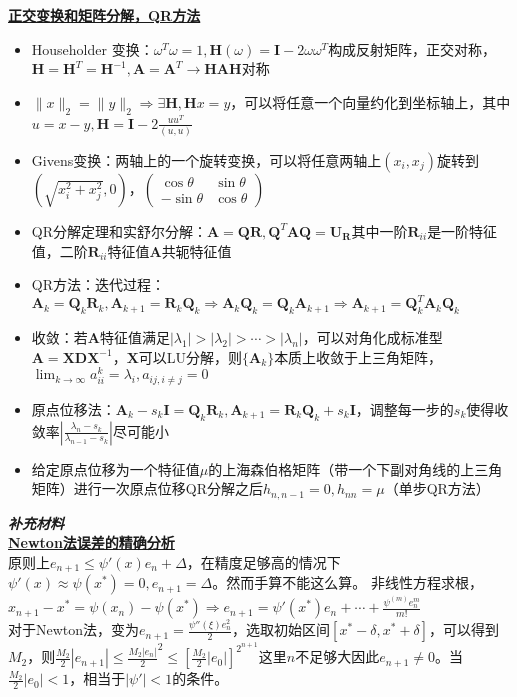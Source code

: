 \documentclass[UTF8,a4paper,landscape,8pt]{paper}
\renewcommand{\subsection}[1]{{\small\textbf{\underline{#1}}}\\ }
\renewcommand{\section}[1]{{\normalsize\textbf{\emph{#1}}}\\ }
\newcommand{\List}[1]{\begin{itemize}[fullwidth,itemindent=0em] #1 \end{itemize}}
\begin{document}
\begin{multicols}{4}
        \subsection{正交变换和矩阵分解，QR方法}
        \List{
            \item{Householder 变换：$\omega^T\omega = 1, \bm H(\omega) = \bm I -2\omega\omega^T$构成反射矩阵，正交对称，$\bm H = \bm H^T = \bm H^{-1}, \bm A = \bm A^T \rightarrow \bm H\bm A\bm H$对称}
            \item {$\|x\|_2 = \|y\|_2 \Rightarrow \exists \bm H, \bm Hx = y$，可以将任意一个向量约化到坐标轴上，其中$u = x - y,\bm H = \bm I  - 2\frac{uu^T}{(u,u)}$}
            \item {Givens变换：两轴上的一个旋转变换，可以将任意两轴上$(x_i,x_j)$旋转到$(\sqrt{x_i^2+x_j^2},0)$，$\begin{pmatrix} \cos\theta & \sin\theta \\ -\sin\theta & \cos\theta\end{pmatrix}$}
            \item {QR分解定理和实舒尔分解：$\bm A = \bm Q\bm R,\bm Q^T\bm A\bm Q = \bm U_{\bm R}$其中一阶$\bm R_{ii}$是一阶特征值，二阶$\bm R_{ii}$特征值$\bm A$共轭特征值}
            \item {QR方法：迭代过程：$\bm A_k = \bm Q_k\bm R_k,\bm A_{k+1} = \bm R_k\bm Q_k \Rightarrow \bm A_k\bm Q_k = \bm Q_k\bm A_{k+1}\Rightarrow \bm A_{k+1} = \bm Q_k^T\bm A_k\bm Q_k$ }
            \item {收敛：若$\bm A$特征值满足$|\lambda_1| >|\lambda_2| >\cdots>|\lambda_n|$，可以对角化成标准型$\bm A = \bm X \bm D \bm X^{-1}$，$\bm X$可以LU分解，则$\{\bm A_k\}$本质上收敛于上三角矩阵，$\lim_{k\to\infty}a_{ii}^k = \lambda_i,a_{ij,i\ne j} = 0$}
            \item {原点位移法：$\bm A_k -s_k\bm I= \bm Q_k\bm R_k,\bm A_{k+1} = \bm R_k\bm Q_k + s_k\bm I$，调整每一步的$s_k$使得收敛率$|\frac{\lambda_n - s_k}{\lambda_{n-1}-s_k}|$尽可能小}
            \item {给定原点位移为一个特征值$\mu$的上海森伯格矩阵（带一个下副对角线的上三角矩阵）进行一次原点位移QR分解之后$h_{n,n-1} = 0,h_{nn} = \mu$（单步QR方法）}
            }
\section{补充材料}
    \subsection{Newton法误差的精确分析}
    原则上$e_{n+1} \le  \psi'(x)e_n + \Delta $，在精度足够高的情况下$\psi'(x) \approx \psi (x^*) = 0,e_{n+1} = \Delta$。然而手算不能这么算。
    非线性方程求根，$x_{n+1} - x^* = \psi(x_n) - \psi(x^*) \Rightarrow e_{n+1} = \psi'(x^*)e_n + \cdots + \frac{\psi^{(m)}e^m_n}{m!}$\\ 
    对于Newton法，变为$e_{n+1} = \frac{\psi''(\xi)e_n^2}2$，选取初始区间$[x^*-\delta,x^*+\delta]$，可以得到$M_2$，则$\frac{M_2}2|e_{n+1}| \le {\frac{M_2|e_n|}2} ^2 \le [\frac{M_2}2|e_0|]^{2^{n+1}}$这里$n$不足够大因此$e_{n+1} \ne 0$。当$\frac{M_2}2|e_0|<1$，相当于$|\psi'| < 1$的条件。\\

\end{multicols}
\end{document}
